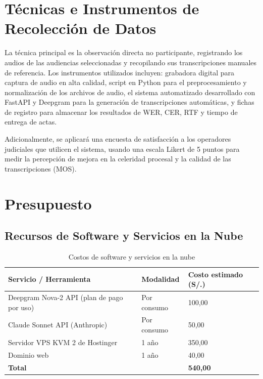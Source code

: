 \documentclass[12pt,a4paper,oneside]{report}
\begin{document}
\section{Técnicas e Instrumentos de Recolección de Datos}

La técnica principal es la observación directa no participante, registrando los audios de las audiencias seleccionadas y recopilando sus transcripciones manuales de referencia. Los instrumentos utilizados incluyen: grabadora digital para captura de audio en alta calidad, script en Python para el preprocesamiento y normalización de los archivos de audio, el sistema automatizado desarrollado con FastAPI y Deepgram para la generación de transcripciones automáticas, y fichas de registro para almacenar los resultados de WER, CER, RTF y tiempo de entrega de actas.

Adicionalmente, se aplicará una encuesta de satisfacción a los operadores judiciales que utilicen el sistema, usando una escala Likert de 5 puntos para medir la percepción de mejora en la celeridad procesal y la calidad de las transcripciones (MOS).

\section{Presupuesto}

\subsection{Recursos de Software y Servicios en la Nube}

\begin{table}[H]
\centering
\caption{Costos de software y servicios en la nube}
\begin{tabular}{|p{5cm}|p{3cm}|p{4cm}|}
\hline
\rowcolor{gray!20}
\textbf{Servicio / Herramienta} & \textbf{Modalidad} & \textbf{Costo estimado (S/.) } \\
\hline
Deepgram Nova-2 API (plan de pago por uso) & Por consumo & 100,00 \\
\hline
Claude Sonnet API (Anthropic) & Por consumo & 50,00 \\
\hline
Servidor VPS KVM 2 de Hostinger & 1 año & 350,00 \\
\hline
Dominio web & 1 año & 40,00 \\
\hline
\textbf{Total} & & \textbf{540,00} \\
\hline
\end{tabular}
\label{tab:software}
\end{table}
\end{document}
